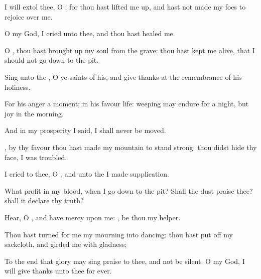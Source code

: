 {\Q {}I will
extol thee, O
{}; for thou hast lifted me
up, and hast not made my
foes to
rejoice over me.


\par }{\Q {}O
{} my
God, I
cried unto thee, and thou hast
healed me.


\par }{\Q {}O
{}, thou hast brought
up my
soul from the
grave: thou hast kept me
alive, that I should not go
down to the
pit.


\par }{\Q {}Sing unto the
{}, O ye
saints of his, and give
thanks at the
remembrance of his
holiness.


\par }{\Q {}For his
anger
{} a
moment; in his
favour
{}
life:
weeping may
endure for a
night, but
joy
{} in the
morning.


\par }{\BB \par }
{\Q {}And in my
prosperity I
said, I shall
never be
moved.


\par }{\Q {}, by thy
favour thou hast made my
mountain to
stand
strong: thou didst
hide thy
face,
{} I was
troubled.


\par }{\Q {}I
cried to thee, O
{}; and unto the
{} I made
supplication.


\par }{\Q {}What
profit
{} in my
blood, when I go
down to the
pit? Shall the
dust
praise thee? shall it
declare thy
truth?


\par }{\Q {}Hear, O
{}, and have
mercy upon me:
{}, be thou my
helper.


\par }{\Q {}Thou hast
turned for me my
mourning into
dancing: thou hast put
off my
sackcloth, and
girded me with
gladness;


\par }{\Q {}To the end that
{}
glory may
sing praise to thee, and not be
silent. O
{} my
God, I will give
thanks unto thee for
ever.




\par }
